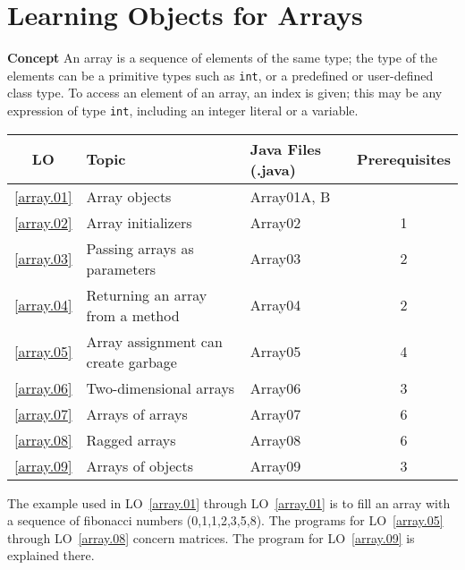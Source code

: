 \section{Learning Objects for Arrays}\label{s.arrays}

\textbf{Concept} An array is a sequence of elements of the same type;
the type of the elements can be a primitive types such as \texttt{int},
or a predefined or user-defined class type. To access an element of an array, an index is given; this may be any expression of type 
\texttt{int}, including an integer literal or a variable.

\begin{center}
\begin{tabular}{|c|l|l|c|}
\hline
LO & Topic  & Java Files (.java) & Prerequisites \\\hline
\ref{array.01} &  Array objects                       & Array01A, B &\\\hline
\ref{array.02} &  Array initializers                  & Array02  &  1\\\hline
\ref{array.03} &  Passing arrays as parameters        & Array03  &  2\\\hline 
\ref{array.04} &  Returning an array from a method    & Array04  &  2\\\hline
\ref{array.05} &  Array assignment can create garbage & Array05  &  4\\\hline
\ref{array.06} &  Two-dimensional arrays              & Array06  &  3\\\hline
\ref{array.07} &  Arrays of arrays                    & Array07  &  6\\\hline
\ref{array.08} &  Ragged arrays                       & Array08  &  6\\\hline
\ref{array.09} &  Arrays of objects                   & Array09  &  3\\\hline
\end{tabular}
\end{center}

The example used in LO~\ref{array.01} through LO~\ref{array.01} is to fill an array 
with a sequence of fibonacci numbers (0,1,1,2,3,5,8). The programs for 
LO~\ref{array.05} through LO~\ref{array.08} concern matrices. 
The program for LO~\ref{array.09} is explained there.










